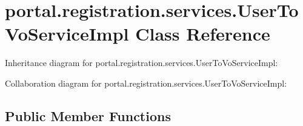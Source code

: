 \hypertarget{classportal_1_1registration_1_1services_1_1UserToVoServiceImpl}{
\section{portal.registration.services.UserToVoServiceImpl Class Reference}
\label{classportal_1_1registration_1_1services_1_1UserToVoServiceImpl}
}


Inheritance diagram for portal.registration.services.UserToVoServiceImpl:


Collaboration diagram for portal.registration.services.UserToVoServiceImpl:
\subsection*{Public Member Functions}
